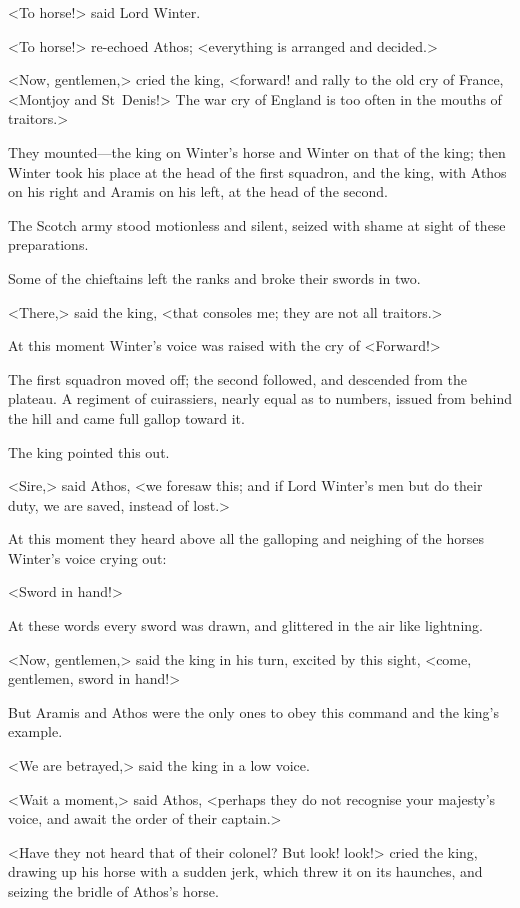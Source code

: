 <To horse!> said Lord Winter.

<To horse!> re-echoed Athos; <everything is arranged and decided.>

<Now, gentlemen,> cried the king, <forward! and rally to the old cry of France, <Montjoy and St~Denis!> The war cry of England is too often in the mouths of traitors.>

They mounted—the king on Winter's horse and Winter on that of the king; then Winter took his place at the head of the first squadron, and the king, with Athos on his right and Aramis on his left, at the head of the second.

The Scotch army stood motionless and silent, seized with shame at sight of these preparations.

Some of the chieftains left the ranks and broke their swords in two.

<There,> said the king, <that consoles me; they are not all traitors.>

At this moment Winter's voice was raised with the cry of <Forward!>

The first squadron moved off; the second followed, and descended from the plateau. A regiment of cuirassiers, nearly equal as to numbers, issued from behind the hill and came full gallop toward it.

The king pointed this out.

<Sire,> said Athos, <we foresaw this; and if Lord Winter's men but do their duty, we are saved, instead of lost.>

At this moment they heard above all the galloping and neighing of the horses Winter's voice crying out:

<Sword in hand!>

At these words every sword was drawn, and glittered in the air like lightning.

<Now, gentlemen,> said the king in his turn, excited by this sight, <come, gentlemen, sword in hand!>

But Aramis and Athos were the only ones to obey this command and the king's example.

<We are betrayed,> said the king in a low voice.

<Wait a moment,> said Athos, <perhaps they do not recognise your majesty's voice, and await the order of their captain.>

<Have they not heard that of their colonel? But look! look!> cried the king, drawing up his horse with a sudden jerk, which threw it on its haunches, and seizing the bridle of Athos's horse.


